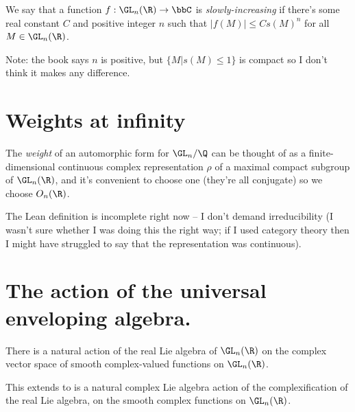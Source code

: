 \begin{definition}
  \label{AutomorphicForm.GLn.IsSlowlyIncreasing}
  \leanok
  We say that a function $f:\GL_n(\R)\to\bbC$ is \emph{slowly-increasing}
  if there's some real constant $C$ and positive integer $n$ such that $|f(M)|\leq Cs(M)^n$
  for all $M\in\GL_n(\R)$.
\end{definition}

Note: the book says $n$ is positive, but $\{M|s(M)\leq 1\}$ is compact so I don't
think it makes any difference.

\section{Weights at infinity}

\begin{definition}
  \label{AutomorphicForm.GLn.Weight}

The \emph{weight} of an automorphic form for $\GL_n/\Q$ can be thought of as a finite-dimensional
continuous complex representation $\rho$ of a maximal compact subgroup of $\GL_n(\R)$,
and it's convenient to choose one (they're all conjugate) so we choose $O_n(\R)$.
\end{definition}

The Lean definition is incomplete right now -- I don't demand irreducibility
(I wasn't sure whether I was doing this the right way; if I used category theory
then I might have struggled to say that the representation was continuous).


\section{The action of the universal enveloping algebra.}

\begin{definition}
  \label{instLieAlgebraAction}
There is a natural action of the real Lie algebra of $\GL_n(\R)$ on the complex vector space of
smooth complex-valued functions on $\GL_n(\R)$.
\end{definition}

\begin{definition}
  \label{instComplexLieAlgebraAction}

  This extends to is a natural complex Lie algebra action of the complexification of
  the real Lie algebra, on the smooth complex functions on $\GL_n(\R)$.

\end{definition}

